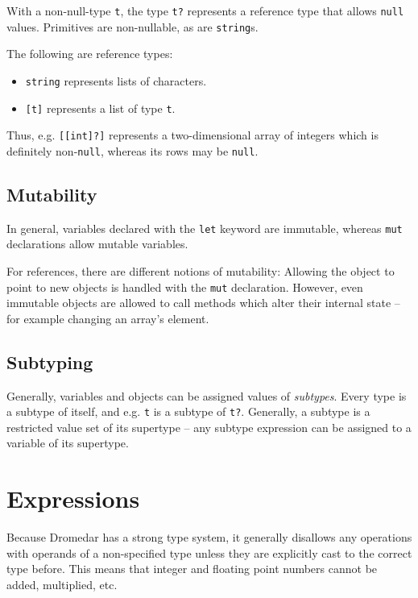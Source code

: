 \documentclass{article}
\newcommand{\code}[1]{\lstinline[columns=fixed]{#1}}
\begin{document}
			With a non-null-type \code{t}, the type \code{t?} represents a reference type that allows \code{null} values. Primitives are non-nullable, as are \code{string}s.
			
			The following are reference types:
			
			\begin{itemize}
				\item \code{string} represents lists of characters.
				\item \code{[t]} represents a list of type \code{t}.
			\end{itemize}
		
			Thus, e.g. \code{[[int]?]} represents a two-dimensional array of integers which is definitely non-\code{null}, whereas its rows may be \code{null}.
		
		\subsection{Mutability}
		
			In general, variables declared with the \code{let} keyword are immutable, whereas \code{mut} declarations allow mutable variables.
			
			For references, there are different notions of mutability: Allowing the object to point to new objects is handled with the \code{mut} declaration. However, even immutable objects are allowed to call methods which alter their internal state -- for example changing an array's element.
			
		\subsection{Subtyping}
		
			Generally, variables and objects can be assigned values of \textit{subtypes}. Every type is a subtype of itself, and e.g. \code{t} is a subtype of \code{t?}. Generally, a subtype is a restricted value set of its supertype -- any subtype expression can be assigned to a variable of its supertype.
		
	\section{Expressions}
	
		Because Dromedar has a strong type system, it generally disallows any operations with operands of a non-specified type unless they are explicitly cast to the correct type before. This means that integer and floating point numbers cannot be added, multiplied, etc.
		
\end{document}
